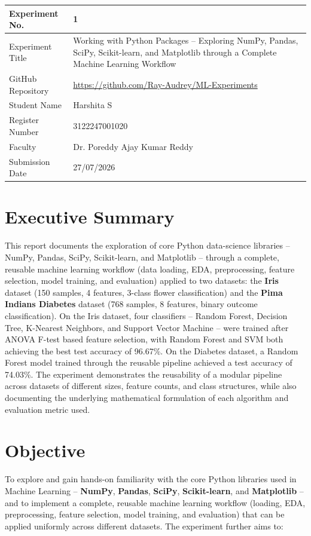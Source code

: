 \documentclass[12pt,a4paper]{article}
\begin{document}
\begin{tabular}{|p{4cm}|p{11cm}|}
\hline
Experiment No. & 1 \\ \hline
Experiment Title & Working with Python Packages -- Exploring NumPy, Pandas, SciPy, Scikit-learn, and Matplotlib through a Complete Machine Learning Workflow \\ \hline
GitHub Repository & \url{https://github.com/Ray-Audrey/ML-Experiments} \\ \hline
Student Name & Harshita S \\ \hline
Register Number & 3122247001020 \\ \hline
Faculty & Dr. Poreddy Ajay Kumar Reddy \\ \hline
Submission Date & 27/07/2026 \\ \hline
\end{tabular}

\section{Executive Summary}

This report documents the exploration of core Python data-science libraries -- NumPy, Pandas, SciPy, Scikit-learn, and Matplotlib -- through a complete, reusable machine learning workflow (data loading, EDA, preprocessing, feature selection, model training, and evaluation) applied to two datasets: the \textbf{Iris} dataset (150 samples, 4 features, 3-class flower classification) and the \textbf{Pima Indians Diabetes} dataset (768 samples, 8 features, binary outcome classification). On the Iris dataset, four classifiers -- Random Forest, Decision Tree, K-Nearest Neighbors, and Support Vector Machine -- were trained after ANOVA F-test based feature selection, with Random Forest and SVM both achieving the best test accuracy of 96.67\%. On the Diabetes dataset, a Random Forest model trained through the reusable pipeline achieved a test accuracy of 74.03\%. The experiment demonstrates the reusability of a modular pipeline across datasets of different sizes, feature counts, and class structures, while also documenting the underlying mathematical formulation of each algorithm and evaluation metric used.

\section{Objective}

To explore and gain hands-on familiarity with the core Python libraries used in Machine Learning -- \textbf{NumPy}, \textbf{Pandas}, \textbf{SciPy}, \textbf{Scikit-learn}, and \textbf{Matplotlib} -- and to implement a complete, reusable machine learning workflow (loading, EDA, preprocessing, feature selection, model training, and evaluation) that can be applied uniformly across different datasets. The experiment further aims to:
\end{document}
